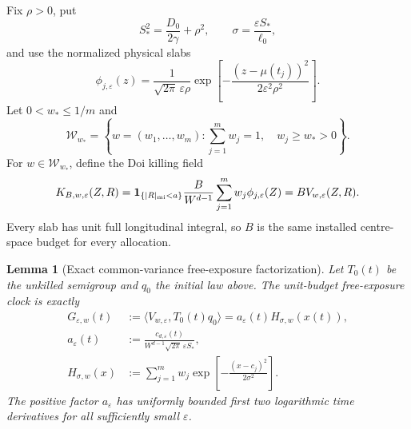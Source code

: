 \documentclass{iopjournal}
\theoremstyle{plain}
\newtheorem{lemma}[theorem]{Lemma}
\theoremstyle{definition}
\begin{document}
Fix \(\rho>0\), put
\begin{equation}
 S_*^2=\frac{D_0}{2\gamma}+\rho^2,
 \qquad \sigma=\frac{\varepsilon S_*}{\ell_0},
 \label{eq:exactmfull-common-width}
\end{equation}
and use the normalized physical slabs
\begin{equation}
 \phi_{j,\varepsilon}(z)
 =\frac{1}{\sqrt{2\pi}\,\varepsilon\rho}
  \exp\!\left[-\frac{(z-\mu(t_j))^2}
  {2\varepsilon^2\rho^2}\right].
 \label{eq:exactmfull-slabs}
\end{equation}
Let \(0<w_*\le1/m\) and
\begin{equation}
 \mathcal W_{w_*}
 =\left\{w=(w_1,\ldots,w_m):
   \sum_{j=1}^m w_j=1,\quad w_j\ge w_*>0\right\}.
 \label{eq:exactmfull-weight-set}
\end{equation}
For \(w\in\mathcal W_{w_*}\), define the Doi killing field
\begin{equation}
 K_{B,w,\varepsilon}(Z,R)
 =\mathbf{1}_{\{|R|_{\rm mi}<a\}}
  \frac{B}{W^{d-1}}\sum_{j=1}^m
  w_j\phi_{j,\varepsilon}(Z)
 =B V_{w,\varepsilon}(Z,R).
 \label{eq:exactmfull-killing}
\end{equation}
Every slab has unit full longitudinal integral, so \(B\) is the same
installed centre-space budget for every allocation.

\begin{lemma}[Exact common-variance free-exposure factorization]
\label{lem:exactmfull-factorization}
Let \(T_0(t)\) be the unkilled semigroup and \(q_0\) the initial law above.
The unit-budget free-exposure clock is exactly
\begin{align}
 G_{\varepsilon,w}(t)
 &:=\langle V_{w,\varepsilon},T_0(t)q_0\rangle
 =a_\varepsilon(t)H_{\sigma,w}(x(t)),
 \label{eq:exactmfull-factorization}\\
 a_\varepsilon(t)
 &:=\frac{c_{d,\varepsilon}(t)}
 {W^{d-1}\sqrt{2\pi}\,\varepsilon S_*},
 \label{eq:exactmfull-slow-factor}\\
 H_{\sigma,w}(x)
 &:=\sum_{j=1}^m w_j
 \exp\!\left[-\frac{(x-c_j)^2}{2\sigma^2}\right].
 \label{eq:exactmfull-mixture}
\end{align}
The positive factor \(a_\varepsilon\) has uniformly bounded first two
logarithmic time derivatives for all sufficiently small \(\varepsilon\).
\end{lemma}
\end{document}
